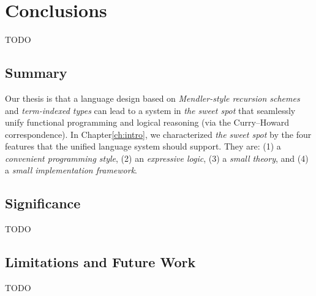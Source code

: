 \chapter{Conclusions}\label{ch:concl} TODO

\section{Summary}
Our thesis is that a language design based on
\emph{Mendler-style recursion schemes} and \emph{term-indexed types}
can lead to a system in \emph{the sweet spot} that seamlessly unify
functional programming and logical reasoning
(via the Curry--Howard correspondence).
In Chapter\ref{ch:intro}, we characterized \emph{the sweet spot} by
the four features that the unified language system should support.
They are: (1) a \emph{convenient programming style},
(2) an \emph{expressive logic}, (3) a \emph{small theory}, and
(4) a \emph{small implementation framework}.

\section{Significance}
TODO

\section{Limitations and Future Work}
TODO
